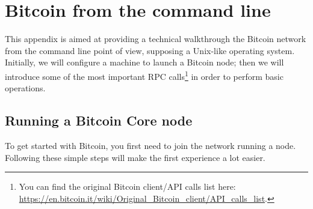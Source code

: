 \chapter{Bitcoin from the command line}
\label{app:A}
This appendix is aimed at providing a technical walkthrough the Bitcoin network from the command line point of view, supposing a Unix-like operating system. Initially, we will configure a machine to launch a Bitcoin node; then we will introduce some of the most important RPC calls\footnote{You can find the original Bitcoin client/API calls list here: \url{https://en.bitcoin.it/wiki/Original_Bitcoin_client/API_calls_list}.} in order to perform basic operations.

\bigskip
\section{Running a Bitcoin Core node}
To get started with Bitcoin, you first need to join the network running a node. Following these simple steps will make the first experience a lot easier.
